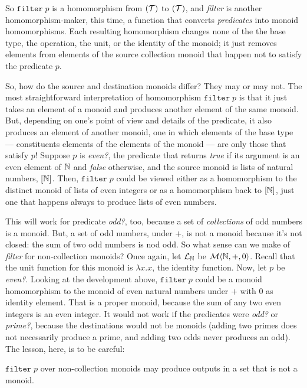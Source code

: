 So $\mathtt{filter}\;p$ is a homomorphism from $(\mathcal{T})$ to $(\mathcal{T})$, and \emph{filter} is another homomorphism-maker, this time, a function that converts \emph{predicates} into monoid homomorphisms. Each resulting homomorphism changes none of the the base type, the operation, the unit, or the identity of the monoid; it just removes elements from elements of the source collection monoid that happen not to satisfy the predicate $p$.


So, how do the source and destination monoids differ? They may or may not. The most straightforward interpretation of homomorphism $\mathtt{filter}\;p$ is that it just takes an element of a monoid and produces another element of the same monoid. But, depending on one's point of view and details of the predicate, it also produces an element of another monoid, one in which elements of the base type --- constituents elements of the elements of the monoid --- are only those that satisfy $p$! Suppose $p$ is \emph{even?}, the predicate that returns \emph{true} if its argument is an even element of $\mathbb{N}$ and \emph{false} otherwise, and the source monoid is lists of natural numbers, $[\mathbb{N}]$. Then, $\mathtt{filter}\;p$ could be viewed either as a homomorphism to the distinct monoid of lists of even integers or as a homomorphism back to $[\mathbb{N}]$, just one that happens always to produce lists of even numbers.


This will work for predicate \emph{odd?}, too, because a set of \emph{collections} of odd numbers is a monoid. But, a set of odd numbers, under $+$, is not a monoid because it's not closed: the sum of two odd numbers is nod odd. So what sense can we make of \emph{filter} for non-collection monoids? Once again, let $\mathcal{L}_{\mathbb{N}}$ be $\mathcal{M}\langle{\mathbb{N}},{+},{0}\rangle$. Recall that the unit function for this monoid is $\lambda x.x$, the identity function. Now, let $p$ be \emph{even?}. Looking at the development above, $\mathtt{filter}\;p$ could be a monoid homomorphism to the monoid of even natural numbers under $+$ with $0$ as identity element. That is a proper monoid, because the sum of any two even integers is an even integer. It would not work if the predicates were \emph{odd?} or \emph{prime?}, because the destinations would not be monoids (adding two primes does not necessarily produce a prime, and adding two odds never produces an odd). The lesson, here, is to be careful:


\begin{observation}
  $\mathtt{filter}\;p$ over non-collection monoids may produce outputs in a set that is not a monoid.
\end{observation}


